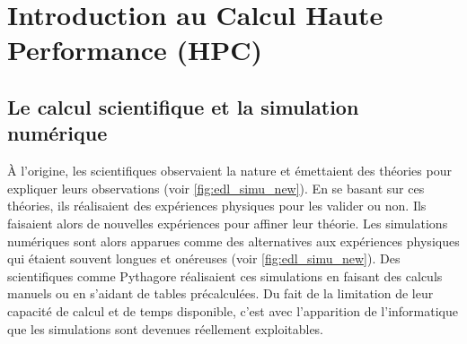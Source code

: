 \section{Introduction au Calcul Haute Performance (HPC)}\label{sec:hpc_intro}


\subsection{Le calcul scientifique et la simulation numérique}

    À l'origine, les scientifiques observaient la nature et émettaient des théories pour expliquer leurs observations (voir \autoref{fig:edl_simu_new}). En se basant sur ces théories, ils réalisaient des expériences physiques pour les valider ou non. Ils faisaient alors de nouvelles expériences pour affiner leur théorie. Les simulations numériques sont alors apparues comme des alternatives aux expériences physiques qui étaient souvent longues et onéreuses (voir \autoref{fig:edl_simu_new}). Des scientifiques comme Pythagore réalisaient ces simulations en faisant des calculs manuels ou en s'aidant de tables précalculées. Du fait de la limitation de leur capacité de calcul et de temps disponible, c'est avec l'apparition de l'informatique que les simulations sont devenues réellement exploitables.
    
